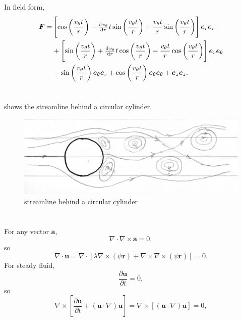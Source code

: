 \documentclass[12pt]{article}
\begin{document}
In field form,
\begin{equation}
	\begin{split}
		\bm{F} = & \left[\cos \left(\frac{v_\theta t}{r}\right) - \od{v_\theta}{r} t \sin \left(\frac{v_\theta t}{r}\right) + \frac{v_\theta t}{r} \sin \left(\frac{v_\theta t}{r}\right) \right]\bm{e}_r \bm{e}_r\\
		& + \left[\sin \left(\frac{v_\theta t}{r}\right) + \od{v_\theta}{r} t \cos \left(\frac{v_\theta t}{r}\right) - \frac{v_\theta t}{r} \cos \left(\frac{v_\theta t}{r}\right) \right]\bm{e}_r \bm{e}_\theta\\
		& - \sin \left(\frac{v_\theta t}{r}\right) \bm{e}_\theta \bm{e}_r + \cos \left(\frac{v_\theta t}{r}\right) \bm{e}_\theta\bm{e}_\theta + \bm{e}_z\bm{e}_z.
	\end{split}
\end{equation}

\section{}

 shows the streamline behind a circular cylinder.

\begin{figure}[htp]
	\centering
	\includegraphics[width=12cm]{streamline.jpg}
	\caption{streamline behind a circular cylinder}
	\label{fig:streamline}
\end{figure}

\section{}

\subsection{}

For any vector $\bm{a}$,
\begin{equation}
	\nabla \cdot \nabla \times \bm{a} = 0,
\end{equation}
so
\begin{equation}
	\nabla \cdot \bm{u} = \nabla \cdot [\lambda \nabla \times(\psi \boldsymbol{r})+\nabla \times \nabla \times(\psi \boldsymbol{r})] = 0.
\end{equation}
For steady fluid,
\begin{equation}
	\frac{\partial \bm{u}}{\partial t} = 0,
\end{equation}
so
\begin{equation}
	\nabla \times \left[ \frac{\partial \bm{u}}{\partial t} + (\bm{u} \cdot \nabla)\bm{u} \right] = \nabla \times \left[ (\bm{u} \cdot \nabla)\bm{u} \right] = 0,
\end{equation}
\end{document}
